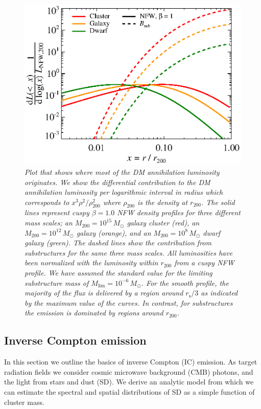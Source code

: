 \documentclass[10pt,aps,pra,reprint,amsmath,amsfonts,amssymb,showpacs,nofootinbib,floatfix]{revtex4-1}
\newcommand{\rmn}{\mathrm}
\newcommand{\msun}{M_\odot}
\newcommand{\s}{\rmn{s}}
\newcommand{\rvir}{r_{200}}
\newcommand{\mvir}{M_{200}}
\begin{document}
\begin{figure}
  \includegraphics[width=0.99\columnwidth]{figures/emissiv.sub.eps}
  \caption{\it Plot that shows where most of the DM annihilation
    luminosity originates. We show the differential contribution to
    the DM annihilation luminosity per logarithmic interval in radius
    which corresponds to $x^3\rho^2/\rho^2_{200}$ where $\rho_{200}$
    is the density at $\rvir$. The solid lines represent cuspy
    $\beta=1.0$ NFW density profiles for three different mass scales;
    an $\mvir=10^{15}\,\msun$ galaxy cluster (red), an
    $\mvir=10^{12}\,\msun$ galaxy (orange), and an
    $\mvir=10^{8}\,\msun$ dwarf galaxy (green). The dashed lines show
    the contribution from substructures for the same three mass
    scales. All luminosities have been normalized with the luminosity
    within $\rvir$ from a cuspy NFW profile. We have assumed the
    standard value for the limiting substructure mass of
    $M_\rmn{lim}=10^{-6}\,\msun$. For the smooth profile, the majority
    of the flux is delivered by a region around $r_\s/3$ as indicated
    by the maximum value of the curves. In contrast, for substructures
    the emission is dominated by regions around $r_{200}$.}
  \label{fig:radial_emis}
\end{figure}


\subsection{Inverse Compton emission}
\label{sect:IC}

In this section we outline the basics of inverse Compton (IC)
emission. As target radiation fields we consider cosmic microwave
background (CMB) photons, and the light from stars and dust (SD). We
derive an analytic model from which we can estimate the spectral
and spatial distributions of SD as a simple function of cluster mass.
\end{document}
